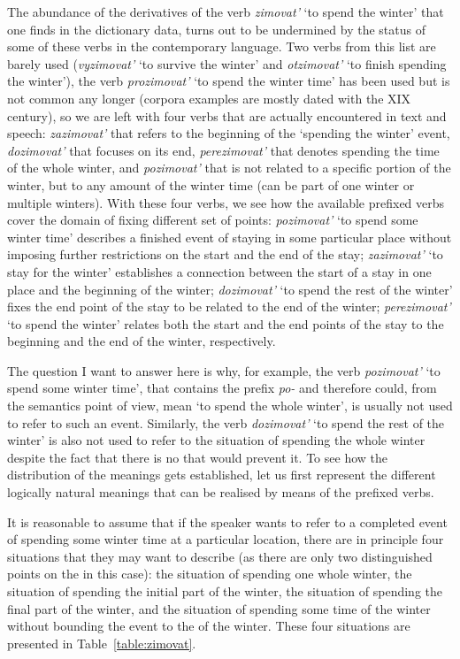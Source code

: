 The abundance of the derivatives of the verb \textit{zimovat'} `to spend the winter' that one finds in the dictionary data, turns out to be undermined by the status of some of these verbs in the contemporary language. Two verbs from this list are barely used (\textit{vyzimovat'} `to survive the winter' and \textit{otzimovat'} `to finish spending the winter'), the verb \textit{prozimovat'} `to spend the winter time' has been used but is not common any longer (corpora examples are mostly dated with the XIX century), so we are left with four verbs that are actually encountered in text and speech: \textit{zazimovat'} that refers to the beginning of the `spending the winter' event, \textit{dozimovat'} that focuses on its end, \textit{perezimovat'} that denotes spending the time of the whole winter, and \textit{pozimovat'} that is not related to a specific portion of the winter, but to any amount of the winter time (can be part of one winter or multiple winters). With these four verbs, we see how the available prefixed verbs cover the domain of fixing different set of points: \textit{pozimovat'} `to spend some winter time' describes a finished event of staying in some particular place without imposing further restrictions on the start and the end of the stay; \textit{zazimovat'} `to stay for the winter' establishes a connection between the start of a stay in one place and the beginning of the winter; \textit{dozimovat'} `to spend the rest of the winter' fixes the end point of the stay to be related to the end of the winter; \textit{perezimovat'} `to spend the winter' relates both the start and the end points of the stay to the beginning and the end of the winter, respectively.

The question I want to answer here is why, for example, the verb \textit{pozimovat'} `to spend some winter time', that contains the prefix \textit{po-} and therefore could, from the semantics point of view, mean `to spend the whole winter', is usually not used to refer to such an event. Similarly, the verb \textit{dozimovat'} `to spend the rest of the winter' is also not used to refer to the situation of spending the whole winter despite the fact that there is no  that would prevent it. To see how the distribution of the meanings gets established, let us first represent the different logically natural meanings that can be realised by means of the prefixed verbs. 

It is reasonable to assume that if the speaker wants to refer to a completed event of spending some winter time at a particular location, there are in principle four situations that they may want to describe (as there are only two distinguished points on the  in this case): the situation of spending one whole winter, the situation of spending the initial part of the winter, the situation of spending the final part of the winter, and the situation of spending some time of the winter without bounding the event  to the  of the winter. These four situations are presented in Table~\ref{table:zimovat}.

